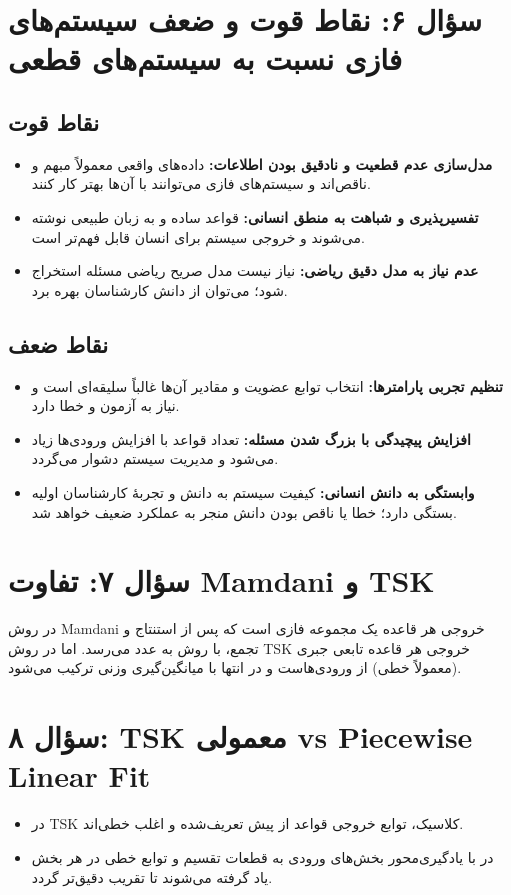 \documentclass[12pt,a4paper]{article}
\begin{document}
	\section*{سؤال ۶: نقاط قوت و ضعف سیستم‌های فازی نسبت به سیستم‌های قطعی}
	\subsection*{نقاط قوت}
	\begin{itemize}
		\item \textbf{مدل‌سازی عدم قطعیت و نادقیق بودن اطلاعات:} داده‌های واقعی معمولاً مبهم و ناقص‌اند و سیستم‌های فازی می‌توانند با آن‌ها بهتر کار کنند.
		\item \textbf{تفسیرپذیری و شباهت به منطق انسانی:} قواعد ساده و به زبان طبیعی نوشته می‌شوند و خروجی سیستم برای انسان قابل فهم‌تر است.
		\item \textbf{عدم نیاز به مدل دقیق ریاضی:} نیاز نیست مدل صریح ریاضی مسئله استخراج شود؛ می‌توان از دانش کارشناسان بهره برد.
	\end{itemize}
	
	\subsection*{نقاط ضعف}
	\begin{itemize}
		\item \textbf{تنظیم تجربی پارامترها:} انتخاب توابع عضویت و مقادیر آن‌ها غالباً سلیقه‌ای است و نیاز به آزمون و خطا دارد.
		\item \textbf{افزایش پیچیدگی با بزرگ شدن مسئله:} تعداد قواعد با افزایش ورودی‌ها زیاد می‌شود و مدیریت سیستم دشوار می‌گردد.
		\item \textbf{وابستگی به دانش انسانی:} کیفیت سیستم به دانش و تجربهٔ کارشناسان اولیه بستگی دارد؛ خطا یا ناقص بودن دانش منجر به عملکرد ضعیف خواهد شد.
	\end{itemize}
	
	\section*{سؤال ۷: تفاوت Mamdani و TSK}
	در روش Mamdani خروجی هر قاعده یک مجموعه فازی است که پس از استنتاج و تجمع، با روش  به عدد می‌رسد. اما در روش TSK خروجی هر قاعده تابعی جبری (معمولاً خطی) از ورودی‌هاست و در انتها با میانگین‌گیری وزنی ترکیب می‌شود.
	
	\section*{سؤال ۸: TSK معمولی vs Piecewise Linear Fit}
	\begin{itemize}
		\item در TSK کلاسیک، توابع خروجی قواعد از پیش تعریف‌شده و اغلب خطی‌اند.
		\item در  با یادگیری‌محور بخش‌های ورودی به قطعات تقسیم و توابع خطی در هر بخش یاد گرفته می‌شوند تا تقریب دقیق‌تر گردد.
	\end{itemize}
	
\end{document}
